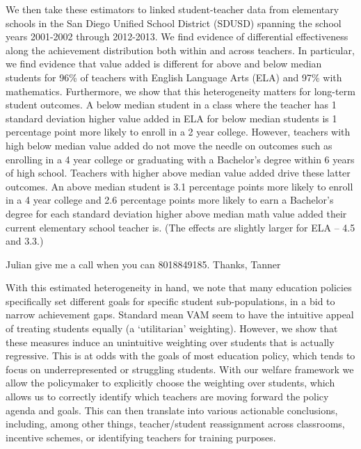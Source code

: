 \documentclass[letterpaper,12pt]{article}
\begin{document}
We then take these estimators to linked student-teacher data from elementary schools in the San Diego Unified School District (SDUSD) spanning the school years 2001-2002 through 2012-2013. We find evidence of differential effectiveness along the achievement distribution both within and across teachers. In particular, we find evidence that value added is different for above and below median students for 96\% of teachers with English Language Arts (ELA) and 97\% with mathematics. Furthermore, we show that this heterogeneity matters for long-term student outcomes. A below median student in a class where the teacher has 1 standard deviation higher value added in ELA for below median students is 1 percentage point more likely to enroll in a 2 year college. However, teachers with high below median value added do not move the needle on outcomes such as enrolling in a 4 year college or graduating with a Bachelor's degree within 6 years of high school. Teachers with higher above median value added drive these latter outcomes. An above median student is 3.1 percentage points more likely to enroll in a 4 year college and 2.6 percentage points more likely to earn a Bachelor's degree for each standard deviation higher above median math value added their current elementary school teacher is. (The effects are slightly larger for ELA -- 4.5 and 3.3.)




Julian give me a call when you can 8018849185. Thanks, Tanner









With this estimated heterogeneity in hand, we note that many education policies specifically set different goals for specific student sub-populations, in a bid to narrow achievement gaps. Standard mean VAM seem to have the intuitive appeal of treating students equally (a `utilitarian' weighting). However, we show that these measures induce an unintuitive weighting over students that is actually regressive. This is at odds with the goals of most education policy, which tends to focus on underrepresented or struggling students. With our welfare framework we allow the policymaker to explicitly choose the weighting over students, which allows us to correctly identify which teachers are moving forward the policy agenda and goals. This can then translate into various actionable conclusions, including, among other things, teacher/student reassignment across classrooms, incentive schemes, or identifying teachers for training purposes.
\end{document}
